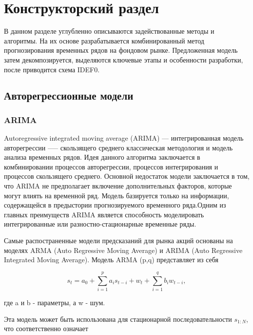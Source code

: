 \section{Конструкторский раздел}

\par В данном разделе углубленно описываются задействованные методы и алгоритмы. На их основе разрабатывается комбинированный метод прогнозирования временных рядов на фондовом рынке. Предложенная модель затем декомпозируется, выделяются ключевые этапы и особенности разработки, после приводится схема IDEF0.

\subsection{Авторегрессионные модели}

\subsubsection{ARIMA}

\par Autoregressive integrated moving average (ARIMA) ---  интегрированная модель авторегрессии —-- скользящего среднего классическая методология и модель анализа временных рядов. Идея данного алгоритма заключается в комбинировании процессов авторегрессии, процессов интегрирования и процессов скользящего среднего. Основной недостаток модели заключается в том, что ARIMA не предполагает включение дополнительных факторов, которые могут влиять на временной ряд. Модель базируется только на информации, содержащейся в предыстории прогнозируемого временного ряда.Одним из главных преимуществ ARIMA является способность моделировать интегрированные или разностно-стационарные временные ряды.

\par Самые распостраненные модели предсказаний для рынка акций основаны на моделях ARMA (Auto Regressive Moving Average) и ARIMA (Auto Regressive Integrated Moving Average). Модель ARMA (p,q) представляет из себя

\begin{equation}
	\label{eq:arima2}
    s_{t} = a_{0} + \sum_{i=1}^{p}a_{i}s_{t-i}+w_{t}+\sum_{i=1}^{q}b_{i}w_{t-i},
\end{equation}

где a и b - параметры, а w - шум.

\newpage

Эта модель может быть использована для стационарной последовательности \(s_{1:N}\), что соответственно означает

